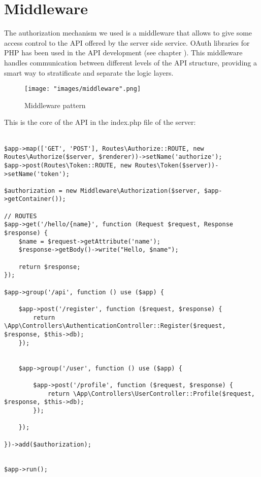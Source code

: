 \section{Middleware}
The authorization mechanism we used is a middleware that allows to give some access control to the API offered by the server side service. OAuth libraries for PHP has been used in the API development (see chapter ). This middleware handles communication between different levels of the API structure, providing a smart way to stratificate and separate the logic layers.

\begin{figure}[H]
\begin{center}
\texttt{[image: "images/middleware".png]}
\caption{Middleware pattern}
\end{center}
\end{figure}

This is the core of the API in the index.php file of the server:\\
\\
\lstset{language=Pascal}
\begin{lstlisting}
$app->map(['GET', 'POST'], Routes\Authorize::ROUTE, new Routes\Authorize($server, $renderer))->setName('authorize');
$app->post(Routes\Token::ROUTE, new Routes\Token($server))->setName('token');

$authorization = new Middleware\Authorization($server, $app->getContainer());

// ROUTES
$app->get('/hello/{name}', function (Request $request, Response $response) {
    $name = $request->getAttribute('name');
    $response->getBody()->write("Hello, $name");

    return $response;
});

$app->group('/api', function () use ($app) {

    $app->post('/register', function ($request, $response) {
        return \App\Controllers\AuthenticationController::Register($request, $response, $this->db);
    });

    
    $app->group('/user', function () use ($app) {

        $app->post('/profile', function ($request, $response) {
            return \App\Controllers\UserController::Profile($request, $response, $this->db);
        });

    });

})->add($authorization);


$app->run();
\end{lstlisting}

